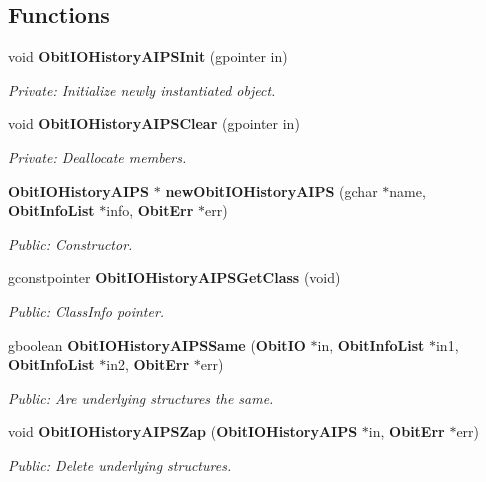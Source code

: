 \subsection*{Functions}
\begin{CompactItemize}
\item 
void {\bf Obit\-IOHistory\-AIPSInit} (gpointer in)
\begin{CompactList}\small\item\em Private: Initialize newly instantiated object. \item\end{CompactList}\item 
void {\bf Obit\-IOHistory\-AIPSClear} (gpointer in)
\begin{CompactList}\small\item\em Private: Deallocate members. \item\end{CompactList}\item 
{\bf Obit\-IOHistory\-AIPS} $\ast$ {\bf new\-Obit\-IOHistory\-AIPS} (gchar $\ast$name, {\bf Obit\-Info\-List} $\ast$info, {\bf Obit\-Err} $\ast$err)
\begin{CompactList}\small\item\em Public: Constructor. \item\end{CompactList}\item 
gconstpointer {\bf Obit\-IOHistory\-AIPSGet\-Class} (void)
\begin{CompactList}\small\item\em Public: Class\-Info pointer. \item\end{CompactList}\item 
gboolean {\bf Obit\-IOHistory\-AIPSSame} ({\bf Obit\-IO} $\ast$in, {\bf Obit\-Info\-List} $\ast$in1, {\bf Obit\-Info\-List} $\ast$in2, {\bf Obit\-Err} $\ast$err)
\begin{CompactList}\small\item\em Public: Are underlying structures the same. \item\end{CompactList}\item 
void {\bf Obit\-IOHistory\-AIPSZap} ({\bf Obit\-IOHistory\-AIPS} $\ast$in, {\bf Obit\-Err} $\ast$err)
\begin{CompactList}\small\item\em Public: Delete underlying structures. \item\end{CompactList}\item 

\end{CompactItemize}
